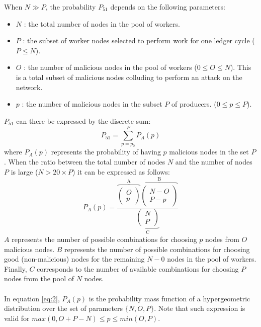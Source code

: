 When $N \gg P$, the probability $P_{51}$ depends on the following parameters:
\begin{itemize}
\item $N$ : the total number of nodes in the pool of workers. 
\item $P$ : the subset of worker nodes selected to perform work for one ledger cycle ($P \leq N$).
\item $O$ : the number of malicious nodes in the pool of workers ($0 \leq O \leq N$). This is a total subset of malicious nodes colluding to perform an attack on the network.
\item $p$ : the number of malicious nodes in the subset $P$ of producers. ($0 \leq p \leq P$).
\end{itemize}
$P_{51}$ can there be expressed by the discrete sum:
\begin{equation}
\label{eq:1}
P_{51} =  \sum_{p=p_0}^{P} P_{A}(p)
\end{equation}
where $P_{A}(p)$ represents the probability of having $p$ malicious nodes in the set $P$. When the ratio between the total number of nodes $N$ and the number of nodes $P$ is large ($N > 20\times P$) it can be expressed as follows: 
\begin{equation}
\label{eq:2}
P_{A}(p) = \frac{\overbrace{\left( \begin{array}{c} O \\
p \end{array} \right)}^\text{A} 
\overbrace{\left( \begin{array}{c} N - O \\ P - p \end{array} \right)}^\text{B}}{\underbrace{\left( \begin{array}{c} N \\
P \end{array} \right)}_\text{C}}
\end{equation}
$A$ represents the number of possible combinations for choosing $p$ nodes from $O$ malicious nodes. $B$ represents the number of possible combinations for choosing good (non-malicious) nodes for the remaining $N-0$ nodes in the pool of workers. Finally, $C$ corresponds to the number of available combinations for choosing $P$ nodes from the pool of $N$ nodes.\\
\\
In equation \ref{eq:2}, $P_A(p)$ is the probability mass function of a hypergeometric distribution over the set of parameters $\{N,O,P\}$. Note that such expression is valid for $max(0,O+P-N) \leq p \leq min(O,P)$. \\

